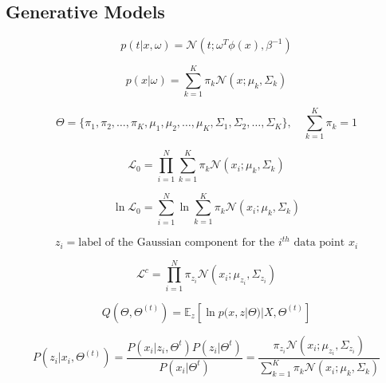 \documentclass[10pt]{article}
\begin{document}
\begin{multicols}{2}
\section*{Generative Models}

\begin{equation}
    \label{eq:generative}
    p(t | x, \omega) = \mathcal{N}(t ; \omega^{T}\phi(x), \beta^{-1})
\end{equation}

\begin{equation*}
    p(x | \omega) = \sum_{k=1}^{K} \pi_{k} \mathcal{N}(x ; \mu_{k}, \Sigma_{k})
\end{equation*}

\begin{equation*}
    \Theta = \{ \pi_{1}, \pi_{2}, \ldots, \pi_{K}, \mu_{1}, \mu_{2}, \ldots, \mu_{K}, \Sigma_{1}, \Sigma_{2}, \ldots, \Sigma_{K} \}, \quad \sum_{k=1}^{K} \pi_{k} = 1
\end{equation*}


\begin{equation*} \label{eq:observed-likelihood}
    \mathcal{L}_0 = \prod_{i=1}^{N} \sum_{k=1}^{K} \pi_{k} \mathcal{N}(x_i ; \mu_{k}, \Sigma_{k})
\end{equation*}

\begin{equation*} \label{eq:log-likelihood}
    \ln \mathcal{L}_0 = \sum_{i=1}^{N} \ln \sum_{k=1}^{K} \pi_{k} \mathcal{N}(x_i ; \mu_{k}, \Sigma_{k})
\end{equation*}

\begin{equation*} \label{eq:hidden-latent}
    z_{i} = \text{label of the Gaussian component for the $i^{th}$ data point $x_i$}
\end{equation*}
    
\begin{equation*}
    \mathcal{L}^c = \prod_{i=1}^{N} \pi_{z_{i}} \mathcal{N}(x_i ; \mu_{z_{i}}, \Sigma_{z_{i}})
\end{equation*}

\begin{equation*}
    Q(\Theta, \Theta^{(t)}) = \mathbb{E}_{z}[\ln p(x, z | \Theta) | X, \Theta^{(t)}]
\end{equation*}

\begin{equation*}
    P(z_{i} | x_{i}, \Theta^{(t)}) = \frac{P(x_i | z_i, \Theta^t) P(z_i | \Theta^t)}{P(x_i | \Theta^t)} = \frac{\pi_{z_{i}} \mathcal{N}(x_i ; \mu_{z_{i}}, \Sigma_{z_{i}})}{\sum_{k=1}^{K} \pi_{k} \mathcal{N}(x_i ; \mu_{k}, \Sigma_{k})} 
\end{equation*}


\end{multicols}
\end{document}
